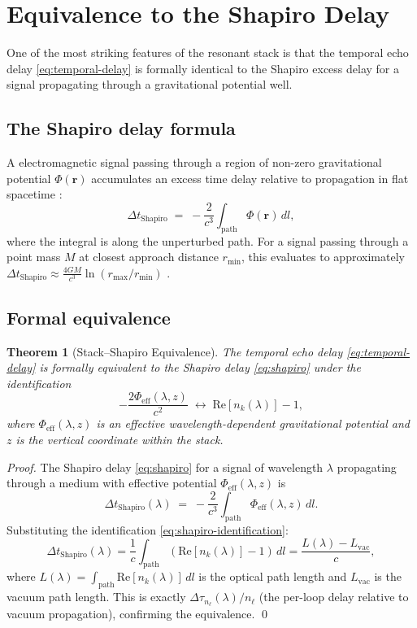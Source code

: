 \documentclass[11pt,twocolumn,a4paper]{article}
\theoremstyle{plain}
\newtheorem{theorem}{Theorem}[section]
\theoremstyle{definition}
\theoremstyle{remark}
\begin{document}
\section{Equivalence to the Shapiro Delay}
\label{sec:shapiro}

One of the most striking features of the resonant stack is that the temporal echo delay \eqref{eq:temporal-delay} is formally identical to the Shapiro excess delay \cite{Shapiro1964} for a signal propagating through a gravitational potential well.

\subsection{The Shapiro delay formula}

A electromagnetic signal passing through a region of non-zero gravitational potential $\Phi(\bm{r})$ accumulates an excess time delay relative to propagation in flat spacetime \cite{LandauLifshitzED}:
\begin{equation}
\label{eq:shapiro}
  \Delta t_\text{Shapiro} \;=\; -\frac{2}{c^3}\int_\text{path}\Phi(\bm{r})\,dl,
\end{equation}
where the integral is along the unperturbed path. For a signal passing through a point mass $M$ at closest approach distance $r_\text{min}$, this evaluates to approximately $\Delta t_\text{Shapiro}\approx \frac{4GM}{c^3}\ln(r_\text{max}/r_\text{min})$ \cite{Shapiro1964}.

\subsection{Formal equivalence}

\begin{theorem}[Stack--Shapiro Equivalence]
\label{thm:shapiro-equiv}
The temporal echo delay \eqref{eq:temporal-delay} is formally equivalent to the Shapiro delay \eqref{eq:shapiro} under the identification
\begin{equation}
\label{eq:shapiro-identification}
  -\frac{2\Phi_\text{eff}(\lambda,z)}{c^2} \;\longleftrightarrow\; \mathrm{Re}[n_k(\lambda)] - 1,
\end{equation}
where $\Phi_\text{eff}(\lambda,z)$ is an effective wavelength-dependent gravitational potential and $z$ is the vertical coordinate within the stack.
\end{theorem}

\begin{proof}
The Shapiro delay \eqref{eq:shapiro} for a signal of wavelength $\lambda$ propagating through a medium with effective potential $\Phi_\text{eff}(\lambda,z)$ is
\[
  \Delta t_\text{Shapiro}(\lambda) \;=\; -\frac{2}{c^3}\int_\text{path}\Phi_\text{eff}(\lambda,z)\,dl.
\]
Substituting the identification \eqref{eq:shapiro-identification}:
\[
  \Delta t_\text{Shapiro}(\lambda) = \frac{1}{c}\int_\text{path}(\mathrm{Re}[n_k(\lambda)]-1)\,dl = \frac{L(\lambda) - L_\text{vac}}{c},
\]
where $L(\lambda)=\int_\text{path}\mathrm{Re}[n_k(\lambda)]\,dl$ is the optical path length and $L_\text{vac}$ is the vacuum path length. This is exactly $\Delta\tau_{n_\ell}(\lambda)/n_\ell$ (the per-loop delay relative to vacuum propagation), confirming the equivalence. \qed
\end{proof}
\end{document}
